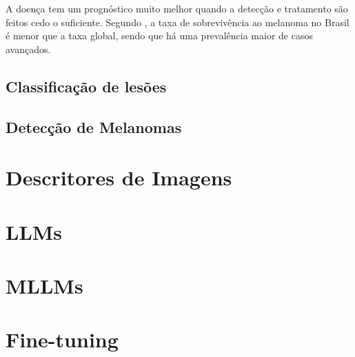 A doença tem um prognóstico muito melhor quando a detecção e tratamento são feitos cedo o suficiente. Segundo \cite{skin_cancer_survival}, a taxa de sobrevivência ao
melanoma no Brasil é menor que a taxa global, sendo que há uma prevalência maior de casos avançados.

\subsection{Classificação de lesões}


\subsection{Detecção de Melanomas}


\section{Descritores de Imagens}

\section{LLMs}

\section{MLLMs}

\section{Fine-tuning}

